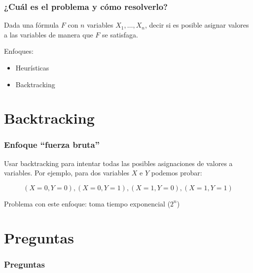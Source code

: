 \documentclass{beamer}
\begin{document}
\frame
{
  \frametitle{¿Cuál es el problema y cómo resolverlo?}

  Dada una fórmula $F$ con $n$ variables $X_1, \ldots, X_n$, decir si es
  posible asignar valores a las variables de manera que $F$ se satisfaga.

  Enfoques:

  \begin{itemize}
  \item Heurísticas
  \item Backtracking
  \end{itemize}
}

\section{Backtracking}

\frame
{
  \frametitle{Enfoque ``fuerza bruta''}

  Usar backtracking para intentar todas las posibles asignaciones de valores a variables. Por
  ejemplo, para dos variables $X$ e $Y$ podemos probar:

  $$
  (X=0,Y=0), (X=0,Y=1), (X=1,Y=0), (X=1,Y=1)
  $$

  Problema con este enfoque: toma tiempo exponencial ($2^n$)
}

\section{Preguntas}

\frame
{
  \frametitle{Preguntas}
}
\end{document}
